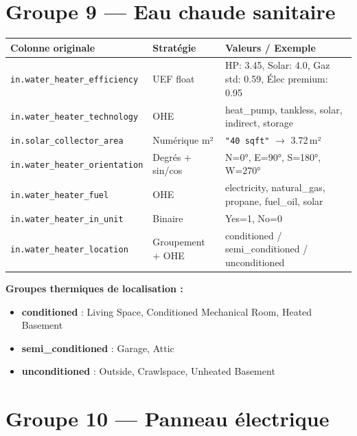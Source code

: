 \documentclass[11pt,a4paper]{article}
\begin{document}
\section{Groupe 9 — Eau chaude sanitaire}

\begin{longtable}{L{5.2cm}L{3.5cm}L{5.3cm}}
\toprule
\textbf{Colonne originale} & \textbf{Stratégie} & \textbf{Valeurs / Exemple} \\
\midrule
\endhead
{}
\texttt{in.water\_heater\_efficiency} & UEF float
  & HP: 3.45, Solar: 4.0, Gaz std: 0.59, Élec premium: 0.95 \\
\texttt{in.water\_heater\_technology} & OHE
  & heat\_pump, tankless, solar, indirect, storage \\
\texttt{in.solar\_collector\_area} & Numérique m²
  & \texttt{"40 sqft"} $\to$ 3.72\,m² \\
\texttt{in.water\_heater\_orientation} & Degrés + sin/cos
  & N=0°, E=90°, S=180°, W=270° \\
\texttt{in.water\_heater\_fuel} & OHE
  & electricity, natural\_gas, propane, fuel\_oil, solar \\
\texttt{in.water\_heater\_in\_unit} & Binaire & Yes=1, No=0 \\
\texttt{in.water\_heater\_location} & Groupement + OHE
  & conditioned / semi\_conditioned / unconditioned \\
\bottomrule
\end{longtable}

\textbf{Groupes thermiques de localisation :}
\begin{itemize}[noitemsep, topsep=2pt]
  \item \textbf{conditioned} : Living Space, Conditioned Mechanical Room, Heated Basement
  \item \textbf{semi\_conditioned} : Garage, Attic
  \item \textbf{unconditioned} : Outside, Crawlspace, Unheated Basement
\end{itemize}

\section{Groupe 10 — Panneau électrique}
\end{document}
